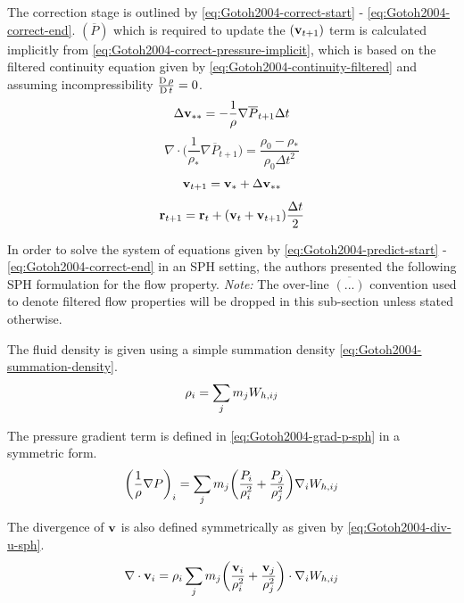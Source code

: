 The correction stage is outlined by \ref{eq:Gotoh2004-correct-start} - \ref{eq:Gotoh2004-correct-end}. $(\overline{P})$ which is required to update the $(\mathbf{v}_{t+1})$ term is calculated implicitly from \ref{eq:Gotoh2004-correct-pressure-implicit}, which is based on the filtered continuity equation given by \ref{eq:Gotoh2004-continuity-filtered} and assuming incompressibility $\frac{\operatorname{D} \rho}{\operatorname{D} t}=0$.
\begin{equation}
	\Delta \mathbf{v}_{**} = -\frac{1}{\rho} \nabla \overline{P}_{t+1} \Delta t
	\label{eq:Gotoh2004-correct-start}
\end{equation}
\begin{equation}
	\nabla \cdot \bigg( \frac{1}{\rho_*} \nabla \overline{P}_{t+1} \bigg) = \frac{\rho_0 - \rho_*}{\rho_0 \Delta t^2}
	\label{eq:Gotoh2004-correct-pressure-implicit}
\end{equation}
\begin{equation}
	\mathbf{v}_{t+1} = \mathbf{v}_* + \Delta \mathbf{v}_{**}
\end{equation}
\begin{equation}
	\mathbf{r}_{t+1} = \mathbf{r}_t + (\mathbf{v}_t + \mathbf{v}_{t+1})\frac{\Delta t}{2}
	\label{eq:Gotoh2004-correct-end}
\end{equation}

In order to solve the system of equations given by \ref{eq:Gotoh2004-predict-start} - \ref{eq:Gotoh2004-correct-end} in an SPH setting, the authors presented the following SPH formulation for the flow property. \textit{Note:} The over-line $\overline{(...)}$ convention used to denote filtered flow properties will be dropped in this sub-section unless stated otherwise.

The fluid density is given using a simple summation density \ref{eq:Gotoh2004-summation-density}.
\begin{equation}
	\rho_i = \sum_j m_jW_{h, ij}
	\label{eq:Gotoh2004-summation-density}
\end{equation}

The pressure gradient term is defined in \ref{eq:Gotoh2004-grad-p-sph} in a symmetric form.
\begin{equation}
	\bigg( \frac{1}{\rho} \nabla P \bigg)_i = \sum_j m_j \bigg( \frac{P_i}{\rho_i^2} + \frac{P_j}{\rho_j^2} \bigg) \nabla_{i} W_{h, ij}
	\label{eq:Gotoh2004-grad-p-sph}
\end{equation}

The divergence of $\mathbf{v}$ is also defined symmetrically as given by \ref{eq:Gotoh2004-div-u-sph}.
\begin{equation}
	\nabla \cdot \mathbf{v}_i = \rho_i \sum_j m_j \bigg(\frac{\mathbf{v}_i}{\rho^2_i} + \frac{\mathbf{v}_j}{\rho^2_j} \bigg) \cdot \nabla_{i} W_{h, ij}
	\label{eq:Gotoh2004-div-u-sph}
\end{equation}


